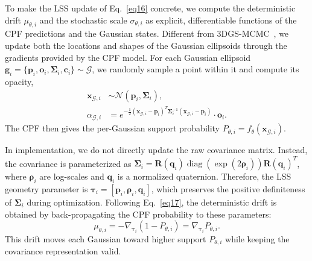 \documentclass[lettersize,journal]{IEEEtran}
\begin{document}
To make the LSS update of Eq.~\ref{eq16} concrete, we compute the deterministic drift ${\mu}_{\theta,i}$ and the stochastic scale ${\sigma}_{\theta,i}$ as explicit, differentiable functions of the CPF predictions and the Gaussian states.
Different from 3DGS-MCMC~\cite{mcmc}, we update both the locations and shapes of the Gaussian ellipsoids through the gradients provided by the CPF model. For each Gaussian ellipsoid $\mathbf{g}_i = \{\mathbf{p}_i, \mathbf{o}_i, \mathbf{\Sigma}_i, \mathbf{c}_i\} \sim \mathcal{G}$, we randomly sample a point within it and compute its opacity, 
\begin{align}
    \mathbf{x}_{\mathcal{G},i} &\sim \mathcal{N} \left( \mathbf{p}_i, \mathbf{\Sigma}_i \right), \label{eq22} \\
    \alpha_{\mathcal{G},i} &= e^{-\frac{1}{2} \left( \mathbf{x}_{\mathcal{G},i} - \mathbf{p}_i \right)^{T} \mathbf{\Sigma}_i^{-1} \left( \mathbf{x}_{\mathcal{G},i} - \mathbf{p}_i \right)} \cdot \mathbf{o}_i. \label{eq23}
\end{align}
The CPF then gives the per-Gaussian support probability $P_{\theta,i}=f_{\theta}(\mathbf{x}_{\mathcal{G},i})$.

In implementation, we do not directly update the raw covariance matrix. Instead, the covariance is parameterized as $\mathbf{\Sigma}_i=\mathbf{R}(\mathbf{q}_i)\operatorname{diag}(\exp(2\boldsymbol{\rho}_i))\mathbf{R}(\mathbf{q}_i)^{T}$, where $\boldsymbol{\rho}_i$ are log-scales and $\mathbf{q}_i$ is a normalized quaternion. Therefore, the LSS geometry parameter is $\boldsymbol{\tau}_i=[\mathbf{p}_i,\boldsymbol{\rho}_i,\mathbf{q}_i]$, which preserves the positive definiteness of $\mathbf{\Sigma}_i$ during optimization. Following Eq.~\ref{eq17}, the deterministic drift is obtained by back-propagating the CPF probability to these parameters:
\begin{equation}
    {\mu}_{\theta,i}= -\nabla_{\boldsymbol{\tau}_i}(1-P_{\theta,i})=\nabla_{\boldsymbol{\tau}_i}P_{\theta,i}.
    \label{eq24}
\end{equation}
This drift moves each Gaussian toward higher support $P_{\theta,i}$ while keeping the covariance representation valid.
\end{document}
